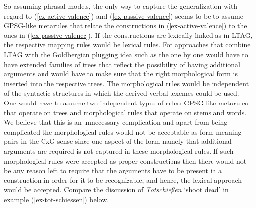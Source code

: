 \begin{exe}
\begin{xlist}[iv.]
\begin{exe}
\begin{xlist}[iv.]
So assuming phrasal models, the only way to capture the generalization with regard to (\ref{ex-active-valence}) and
(\ref{ex-passive-valence}) seems to be to assume GPSG-like metarules that relate the constructions
in (\ref{ex-active-valence}) to the ones in (\ref{ex-passive-valence}). If the constructions are
lexically linked as in LTAG, the respective mapping rules would be lexical rules. For approaches
that combine LTAG with the Goldbergian plugging idea such as the one by \citet{KO2012a} one would have to
have extended families of trees that reflect the possibility of having additional arguments and
would have to make sure that the right morphological form is inserted into the respective trees. The
morphological rules would be independent of the syntactic structures in which the derived verbal
lexemes could be used. One would have to assume two independent types of rules: GPSG-like metarules
that operate on trees and morphological rules that operate on stems and words. We believe that this
is an unnecessary complication and apart from being complicated the morphological rules would not
be acceptable as form-meaning pairs in the CxG sense since one aspect of the form namely that additional
arguments are required is not captured in these morphological rules. If such morphological rules
were accepted as proper constructions then there would not be any reason left to require that the
arguments have to be present in a construction in order for it to be recognizable, and hence, the
lexical approach would be accepted. Compare the discussion of \emph{Totschießen} `shoot dead' in
example (\ref{ex-tot-schiessen}) below.



\end{xlist}
\end{exe}
\end{xlist}
\end{exe}

